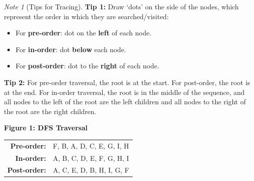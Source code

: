 \documentclass{article}
\theoremstyle{plain}
\theoremstyle{definition}
\theoremstyle{remark}
\newtheorem*{note}{Note}
\begin{document}
\begin{note}[Tips for Tracing]
    \textbf{Tip 1:} Draw `dots' on the side of the nodes, which represent the order in which they are searched/visited:
    \begin{itemize}
        \item For \textbf{pre-order}: dot on the \textbf{left} of each node.
        \item For \textbf{in-order}: dot \textbf{below} each node.
        \item For \textbf{post-order}: dot to the \textbf{right} of each node.
    \end{itemize}
    \textbf{Tip 2:} For pre-order traversal, the root is at the start. For post-order, the root is at the end. For in-order traversal, the root is in the middle of the sequence, and all nodes to the left of the root are the left children and all nodes to the right of the root are the right children.
\end{note}

\vspace{1em}
\begin{center}
\end{center}
\begin{center}
\textbf{Figure 1: DFS Traversal} \\
\vspace{0.5em}
\begin{tabular}{rl}
    \textbf{Pre-order:} & F, B, A, D, C, E, G, I, H \\
    \textbf{In-order:} & A, B, C, D, E, F, G, H, I \\
    \textbf{Post-order:} & A, C, E, D, B, H, I, G, F
\end{tabular}
\end{center}
\vspace{1em}
\end{document}
